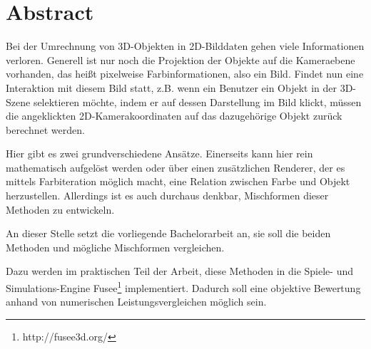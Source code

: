 \section{Abstract}

Bei der Umrechnung von 3D-Objekten in 2D-Bilddaten gehen viele Informationen verloren. Generell ist nur noch die Projektion der Objekte auf die Kameraebene vorhanden, das heißt pixelweise Farbinformationen, also ein Bild. Findet nun eine Interaktion mit diesem Bild statt, z.B. wenn ein Benutzer ein Objekt in der 3D-Szene selektieren möchte, indem er auf dessen Darstellung im Bild klickt, müssen die angeklickten 2D-Kamerakoordinaten auf das dazugehörige Objekt zurück berechnet werden.


Hier gibt es zwei grundverschiedene Ansätze. Einerseits kann hier rein mathematisch aufgelöst werden oder über einen zusätzlichen Renderer, der es mittels Farbiteration möglich macht, eine Relation zwischen Farbe und Objekt herzustellen. Allerdings ist es auch durchaus denkbar, Mischformen dieser Methoden zu entwickeln.


An dieser Stelle setzt die vorliegende Bachelorarbeit an, sie soll die beiden Methoden und mögliche Mischformen vergleichen.


Dazu werden im praktischen Teil der Arbeit, diese Methoden in die Spiele- und Simulations-Engine Fusee\footnote{http://fusee3d.org/} implementiert. Dadurch soll eine objektive Bewertung anhand von numerischen Leistungsvergleichen möglich sein. \cite{Gregory.2010}